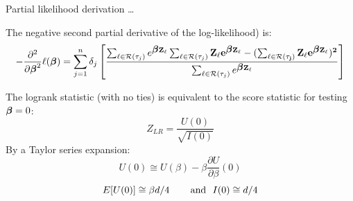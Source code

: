 \documentclass[ignorenonframetext,]{beamer}
\newcommand{\bbeta}{\mbox{\boldmath$\beta$}}
\newcommand{\bZ}{\bf Z}
\begin{document}
\begin{frame}{%
\protect\hypertarget{partial-likelihood-derivation}{%
Partial likelihood derivation \ldots}}

The negative second partial derivative of the log-likelihood) is:
\footnotesize \[
-\frac{\partial^2}{\partial \bbeta^2} \ell(\bbeta) =
 \sum_{j=1}^{n}   \delta_j \left[     
\frac{ \sum_{\ell \in {\cal R}(\tau_j)} e^{\bbeta \bZ_{\ell}}
\sum_{\ell \in {\cal R}(\tau_j)} \bZ_{\ell} e^{\bbeta \bZ_{\ell}}-
(\sum_{\ell \in {\cal R}(\tau_j)} \bZ_{\ell} e^{\bbeta \bZ_{\ell}})^2}
{ \sum_{\ell \in {\cal R}(\tau_j)} e^{\bbeta  \bZ_{\ell}} } \right]
\]

\normalsize

The logrank statistic (with no ties) is equivalent to the score
statistic for testing \(\bbeta=0\): \[
Z_{LR} = \frac{U(0)}{\sqrt{I(0)}}
\] By a Taylor series expansion:
\[U(0) \cong U(\beta)- \beta \frac{\partial U}{\partial \beta}(0)\]
\[E[U(0)]\cong \beta d /4 \hspace{0.3in} \text{and ~} I(0)\cong d/4\]

\end{frame}
\end{document}
